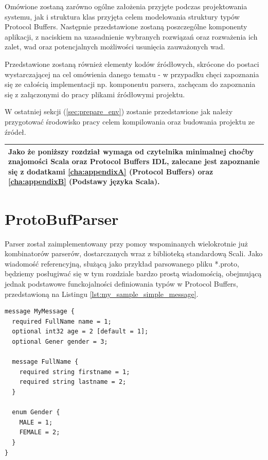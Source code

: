 \documentclass[pdflatex,11pt]{aghdpl}
\begin{document}
Omówione zostaną zarówno ogólne założenia przyjęte podczas projektowania systemu, jak i struktura klas przyjęta celem
modelowania struktury typów Protocol Buffers. Następnie przedstawione zostaną poszczególne komponenty aplikacji, z naciskiem na uzasadnienie
wybranych rozwiązań oraz rozważenia ich zalet, wad oraz potencjalnych możliwości usunięcia zauważonych wad. 

Przedstawione zostaną również elementy kodów źródłowych, skrócone do postaci wystarczającej na cel omówienia danego tematu 
- w przypadku chęci zapoznania się ze całością implementacji np. komponentu parsera, zachęcam do zapoznania się 
z załączonymi do pracy plikami źródłowymi projektu.

W ostatniej sekcji (\ref{sec:prepare_env}) zostanie przedstawione jak należy przygotować środowisko pracy celem kompilowania oraz budowania projektu
ze źródeł.

\begin{center}
\begin{tabular}{ | p{\textwidth} | }
\hline 
Jako że poniższy rozdział wymaga od czytelnika minimalnej choćby znajomości Scala oraz Protocol Buffers IDL, zalecane jest zapoznanie się z 
dodatkami \ref{cha:appendixA} (Protocol Buffers) oraz \ref{cha:appendixB} (Podstawy języka Scala). \\ \hline
\end{tabular}
\end{center}


\newpage
\section{ProtoBufParser}
\label{sec:protoBufParser}
Parser został zaimplementowany przy pomoy wspominanych wielokrotnie już kombinatorów parserów, 
dostarczanych wraz z biblioteką standardową Scali. Jako wiadomość referencyjną, służącą jako przykład parsowanego pliku *.proto, 
będziemy posługiwać się w tym rozdziale bardzo prostą wiadomością, obejmującą jednak podstawowe funckojalności definiowania typów
w Protocol Buffers, przedstawioną na Listingu \ref{lst:my_sample_simple_message}.

\begin{lstlisting}[caption={Przykład wiadomości, służący łatwiejszej wizualizacji działania parsera}, label={lst:my_sample_simple_message}]
message MyMessage {
  required FullName name = 1;
  optional int32 age = 2 [default = 1];
  optional Gener gender = 3;

  message FullName {
    required string firstname = 1;
    required string lastname = 2;
  }

  enum Gender {
    MALE = 1;
    FEMALE = 2;
  }
}
\end{lstlisting}
\end{document}
